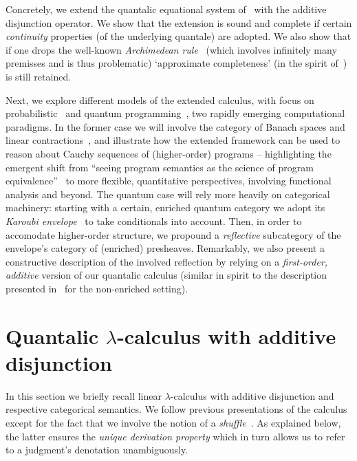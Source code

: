 \documentclass[submission,copyright,creativecommons]{eptcs}
\begin{document}
Concretely, we extend the quantalic equational system
of~\cite{dahlqvist22,dahlqvist2023syntactic} with the additive disjunction
operator. We show that the extension is sound and complete if certain
\emph{continuity} properties (of the underlying quantale) are adopted.  We also
show that if one drops the well-known \emph{Archimedean
rule}~\cite{mardare2016quantitative,mardare2017axiomatizability} (which
involves infinitely many premisses and is thus problematic) `approximate
completeness' (in the spirit of~\cite{dahlqvist2023syntactic}) is still
retained.

Next, we explore different models of the extended calculus, with focus on
probabilistic~\cite{dahlqvist19,barthe20} and quantum
programming~\cite{selinger2004towards,malherbe13}, two rapidly emerging
computational paradigms. In the former case we will involve the category of
Banach spaces and linear
contractions~\cite{dahlqvist19,dahlqvist2023syntactic}, and illustrate how the
extended framework can be used to reason about Cauchy sequences of
(higher-order) programs -- highlighting the emergent shift from ``seeing
program semantics as the science of program equivalence''~\cite{lago22} to more
flexible, quantitative perspectives, involving functional analysis and beyond.
The quantum case will rely more heavily on categorical machinery: starting with
a certain, enriched quantum category we adopt its \emph{Karoubi
envelope}~\cite{borceux94} to take conditionals into account. Then, in order to
accomodate higher-order structure, we propound a \emph{reflective} subcategory
of the envelope's category of (enriched) presheaves. Remarkably, we also
present a constructive description of the involved reflection by relying on a
\emph{first-order, additive} version of our quantalic calculus (similar in
spirit to the description presented in~\cite{fu22} for the non-enriched
setting).

\section{Quantalic $\lambda$-calculus with additive disjunction }
\label{sec:internal}
In this section we briefly recall linear $\lambda$-calculus with additive
disjunction and respective categorical semantics. We follow previous
presentations of the calculus~\cite{mackie93,benton92,maietti05} except for the
fact that we involve the notion of a \emph{shuffle}~\cite{shulman19}. As
explained below, the latter ensures the \emph{unique derivation property} which
in turn allows us to refer to a judgment's denotation unambiguously.
\end{document}
